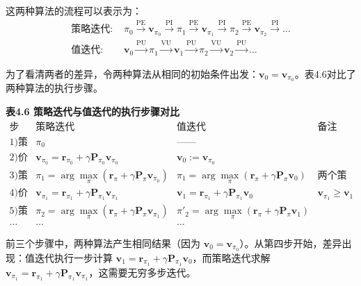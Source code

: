 \documentclass[UTF8]{article}
\begin{document}
这两种算法的流程可以表示为：
\[
\begin{aligned}
\text{策略迭代: } &\pi_0 \xrightarrow{\text{PE}} \boldsymbol{v}_{\pi_0} \xrightarrow{\text{PI}} \pi_1 \xrightarrow{\text{PE}} \boldsymbol{v}_{\pi_1} \xrightarrow{\text{PI}} \pi_2 \xrightarrow{\text{PE}} \boldsymbol{v}_{\pi_2} \xrightarrow{\text{PI}} \dots \\
\text{值迭代: } &\boldsymbol{v}_0 \xrightarrow{\text{PU}} \pi_1 \xrightarrow{\text{VU}} \boldsymbol{v}_1 \xrightarrow{\text{PU}} \pi_2 \xrightarrow{\text{VU}} \boldsymbol{v}_2 \xrightarrow{\text{PU}} \dots
\end{aligned}
\]

为了看清两者的差异，令两种算法从相同的初始条件出发：$\boldsymbol{v}_0 = \boldsymbol{v}_{\pi_0}$。表4.6对比了两种算法的执行步骤。

\begin{center}
\textbf{表4.6 策略迭代与值迭代的执行步骤对比}
\[
\begin{array}{c|c|c|c}
\text{步骤} & \text{策略迭代} & \text{值迭代} & \text{备注} \\
\hline
1) \text{策略} & \pi_0 & \text{——} & \\
2) \text{价值} & \boldsymbol{v}_{\pi_0} = \boldsymbol{r}_{\pi_0} + \gamma \boldsymbol{P}_{\pi_0} \boldsymbol{v}_{\pi_0} & \boldsymbol{v}_0 := \boldsymbol{v}_{\pi_0} & \\
3) \text{策略} & \pi_1 = \arg\max_\pi (\boldsymbol{r}_\pi + \gamma \boldsymbol{P}_\pi \boldsymbol{v}_{\pi_0}) & \pi_1 = \arg\max_\pi (\boldsymbol{r}_\pi + \gamma \boldsymbol{P}_\pi \boldsymbol{v}_0) & \text{两个策略相同} \\
4) \text{价值} & \boldsymbol{v}_{\pi_1} = \boldsymbol{r}_{\pi_1} + \gamma \boldsymbol{P}_{\pi_1} \boldsymbol{v}_{\pi_1} & \boldsymbol{v}_1 = \boldsymbol{r}_{\pi_1} + \gamma \boldsymbol{P}_{\pi_1} \boldsymbol{v}_0 & \boldsymbol{v}_{\pi_1} \geq \boldsymbol{v}_1 \\
5) \text{策略} & \pi_2 = \arg\max_\pi (\boldsymbol{r}_\pi + \gamma \boldsymbol{P}_\pi \boldsymbol{v}_{\pi_1}) & \pi'_2 = \arg\max_\pi (\boldsymbol{r}_\pi + \gamma \boldsymbol{P}_\pi \boldsymbol{v}_1) & \\
\dots & \dots & \dots &
\end{array}
\]
\end{center}

前三个步骤中，两种算法产生相同结果（因为 $\boldsymbol{v}_0 = \boldsymbol{v}_{\pi_0}$）。从第四步开始，差异出现：值迭代执行一步计算 $\boldsymbol{v}_1 = \boldsymbol{r}_{\pi_1} + \gamma \boldsymbol{P}_{\pi_1} \boldsymbol{v}_0$，而策略迭代求解 $\boldsymbol{v}_{\pi_1} = \boldsymbol{r}_{\pi_1} + \gamma \boldsymbol{P}_{\pi_1} \boldsymbol{v}_{\pi_1}$，这需要无穷多步迭代。
\end{document}
